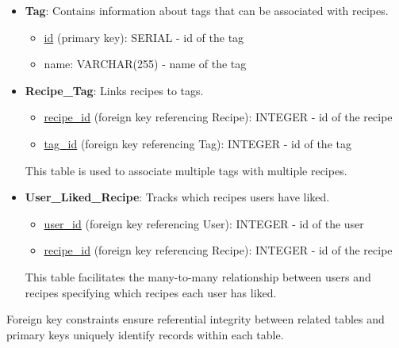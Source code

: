 \begin{itemize}
      \item \textbf{Tag}: Contains information about tags that can be associated with recipes.
    \begin{itemize}
        \item \underline{id} (primary key): SERIAL - id of the tag
        \item name: VARCHAR(255) - name of the tag
    \end{itemize}
    
    
    \item \textbf{Recipe\_Tag}: Links recipes to tags.
    \begin{itemize}
        \item \underline{recipe\_id} (foreign key referencing Recipe): INTEGER - id of the recipe
        \item \underline{tag\_id} (foreign key referencing Tag): INTEGER - id of the tag
    \end{itemize}
    This table is used to associate multiple tags with multiple recipes.
    
  
    \item \textbf{User\_Liked\_Recipe}: Tracks which recipes users have liked.
    \begin{itemize}
        \item \underline{user\_id} (foreign key referencing User): INTEGER - id of the user
        \item \underline{recipe\_id} (foreign key referencing Recipe): INTEGER - id of the recipe
    \end{itemize}
    This table facilitates the many-to-many relationship between users and recipes specifying which recipes each user has liked.
    

  
\end{itemize}

Foreign key constraints ensure referential integrity between related tables and primary keys uniquely identify records within each table.
